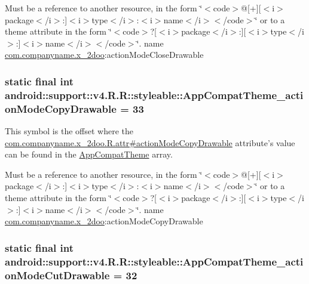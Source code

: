 Must be a reference to another resource, in the form \char`\"{}$<$code$>$@\mbox{[}+\mbox{]}\mbox{[}$<$i$>$package$<$/i$>$:\mbox{]}$<$i$>$type$<$/i$>$:$<$i$>$name$<$/i$>$$<$/code$>$\char`\"{} or to a theme attribute in the form \char`\"{}$<$code$>$?\mbox{[}$<$i$>$package$<$/i$>$:\mbox{]}\mbox{[}$<$i$>$type$<$/i$>$:\mbox{]}$<$i$>$name$<$/i$>$$<$/code$>$\char`\"{}.  name \hyperlink{namespacecom_1_1companyname_1_1x__2doo}{com.companyname.x\_\-2doo}:actionModeCloseDrawable \hypertarget{classandroid_1_1support_1_1v4_1_1_r_1_1styleable_6efcfd6f29a1ed5f1e115d527ad02db2}{
\subsubsection[{AppCompatTheme\_\-actionModeCopyDrawable}]{\setlength{\rightskip}{0pt plus 5cm}static final int android::support::v4.R.R::styleable::AppCompatTheme\_\-actionModeCopyDrawable = 33}}
\label{classandroid_1_1support_1_1v4_1_1_r_1_1styleable_6efcfd6f29a1ed5f1e115d527ad02db2}


This symbol is the offset where the \hyperlink{classcom_1_1companyname_1_1x__2doo_1_1_r_1_1attr_2624652073828ad02745d5949356a277}{com.companyname.x\_\-2doo.R.attr\#actionModeCopyDrawable} attribute's value can be found in the \hyperlink{classandroid_1_1support_1_1v4_1_1_r_1_1styleable_0873e92ba21076bb5a4aeadeb7f5779f}{AppCompatTheme} array.

Must be a reference to another resource, in the form \char`\"{}$<$code$>$@\mbox{[}+\mbox{]}\mbox{[}$<$i$>$package$<$/i$>$:\mbox{]}$<$i$>$type$<$/i$>$:$<$i$>$name$<$/i$>$$<$/code$>$\char`\"{} or to a theme attribute in the form \char`\"{}$<$code$>$?\mbox{[}$<$i$>$package$<$/i$>$:\mbox{]}\mbox{[}$<$i$>$type$<$/i$>$:\mbox{]}$<$i$>$name$<$/i$>$$<$/code$>$\char`\"{}.  name \hyperlink{namespacecom_1_1companyname_1_1x__2doo}{com.companyname.x\_\-2doo}:actionModeCopyDrawable \hypertarget{classandroid_1_1support_1_1v4_1_1_r_1_1styleable_ff9fdface004857501db9de7aedb1dd6}{
\subsubsection[{AppCompatTheme\_\-actionModeCutDrawable}]{\setlength{\rightskip}{0pt plus 5cm}static final int android::support::v4.R.R::styleable::AppCompatTheme\_\-actionModeCutDrawable = 32}}
\label{classandroid_1_1support_1_1v4_1_1_r_1_1styleable_ff9fdface004857501db9de7aedb1dd6}


